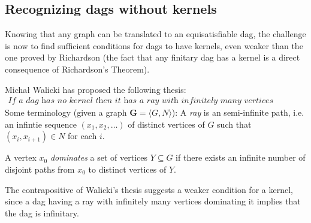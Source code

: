 
\subsection{Recognizing dags without kernels}
\label{sub:Recognizing dags without kernels}
Knowing that any graph can be translated to an equisatisfiable dag, the challenge is now to find sufficient conditions for dags to have kernels, even weaker than the one proved by Richardson (the fact that any finitary dag has a kernel is a direct consequence of Richardson's Theorem).

Michał Walicki has proposed the following thesis:
\begin{align}
  \textit{If a dag has no kernel then it has a ray with infinitely many vertices dominating it.}
\end{align}
Some terminology (given a graph $\mathbf{G} = \langle G,N \rangle$):
A \textit{ray} is an semi-infinite path, i.e. an infintie sequence $(x_1, x_2, \dots)$ of distinct vertices of $G$ such that $(x_i,x_{i+1}) \in N$ for each $i$.

A vertex $x_0$ \textit{dominates} a set of vertices $Y \subseteq G$ if there exists an infinite number of disjoint paths from $x_0$ to distinct vertices of $Y$.

The contrapositive of Walicki's thesis suggests a weaker condition for a kernel, since a dag having a ray with infinitely many vertices dominating it implies that the dag is infinitary.
